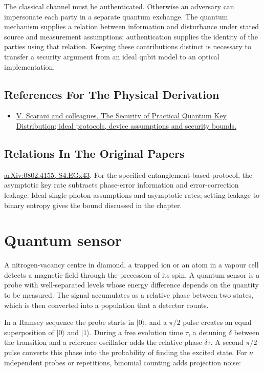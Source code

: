 \documentclass[11pt,oneside]{book}
\begin{document}
The classical channel must be authenticated. Otherwise an adversary can impersonate each party in a separate quantum exchange. The quantum mechanism supplies a relation between information and disturbance under stated source and measurement assumptions; authentication supplies the identity of the parties using that relation. Keeping these contributions distinct is necessary to transfer a security argument from an ideal qubit model to an optical implementation.

\subsection*{References For The Physical Derivation}
\begin{itemize}
\item \href{https://arxiv.org/abs/0802.4155}{V. Scarani and colleagues, The Security of Practical Quantum Key Distribution; ideal protocols, device assumptions and security bounds.}
\end{itemize}

\subsection*{Relations In The Original Papers}

\href{https://arxiv.org/html/0802.4155#S4.EGx43}{arXiv:0802.4155, S4.EGx43}. For the specified entanglement-based protocol, the asymptotic key rate subtracts phase-error information and error-correction leakage. Ideal single-photon assumptions and asymptotic rates; setting leakage to binary entropy gives the bound discussed in the chapter.



\clearpage

\section{Quantum sensor}

\label{topic:quantum-sensor}

A nitrogen-vacancy centre in diamond, a trapped ion or an atom in a vapour cell detects a magnetic field through the precession of its spin. A quantum sensor is a probe with well-separated levels whose energy difference depends on the quantity to be measured. The signal accumulates as a relative phase between two states, which is then converted into a population that a detector counts.

In a Ramsey sequence the probe starts in \(|0\rangle\), and a \(\pi/2\) pulse creates an equal superposition of \(|0\rangle\) and \(|1\rangle\). During a free evolution time \(\tau\), a detuning \(\delta\) between the transition and a reference oscillator adds the relative phase \(\delta\tau\). A second \(\pi/2\) pulse converts this phase into the probability of finding the excited state. For \(\nu\) independent probes or repetitions, binomial counting adds projection noise:
\end{document}
